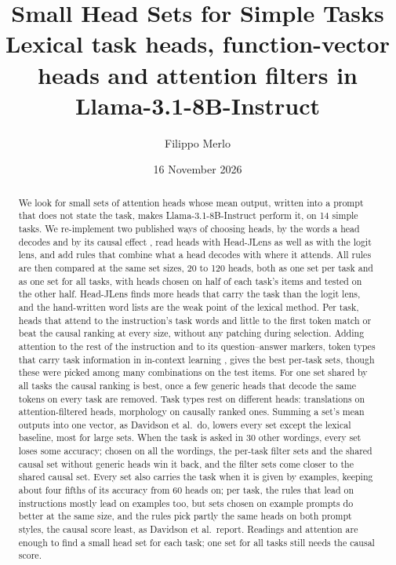 \documentclass[10pt,a4paper]{article}
\title{Small Head Sets for Simple Tasks\\[2pt]
\large Lexical task heads, function-vector heads and attention filters in Llama-3.1-8B-Instruct}
\author{Filippo Merlo}
\date{16 November 2026}
\begin{document}
\maketitle

\begin{abstract}
We look for small sets of attention heads whose mean output, written into a prompt that does not state the task, makes Llama-3.1-8B-Instruct perform it, on 14 simple tasks. We re-implement two published ways of choosing heads, by the words a head decodes \citep{yang2026shared} and by its causal effect \citep{davidson2025different}, read heads with Head-JLens as well as with the logit lens, and add rules that combine what a head decodes with where it attends. All rules are then compared at the same set sizes, 20 to 120 heads, both as one set per task and as one set for all tasks, with heads chosen on half of each task's items and tested on the other half. Head-JLens finds more heads that carry the task than the logit lens, and the hand-written word lists are the weak point of the lexical method. Per task, heads that attend to the instruction's task words and little to the first token match or beat the causal ranking at every size, without any patching during selection. Adding attention to the rest of the instruction and to its question--answer markers, token types that carry task information in in-context learning \citep{bai2026performance}, gives the best per-task sets, though these were picked among many combinations on the test items. For one set shared by all tasks the causal ranking is best, once a few generic heads that decode the same tokens on every task are removed. Task types rest on different heads: translations on attention-filtered heads, morphology on causally ranked ones. Summing a set's mean outputs into one vector, as Davidson et al.\ do, lowers every set except the lexical baseline, most for large sets. When the task is asked in 30 other wordings, every set loses some accuracy; chosen on all the wordings, the per-task filter sets and the shared causal set without generic heads win it back, and the filter sets come closer to the shared causal set. Every set also carries the task when it is given by examples, keeping about four fifths of its accuracy from 60 heads on; per task, the rules that lead on instructions mostly lead on examples too, but sets chosen on example prompts do better at the same size, and the rules pick partly the same heads on both prompt styles, the causal score least, as Davidson et al.\ report. Readings and attention are enough to find a small head set for each task; one set for all tasks still needs the causal score.
\end{abstract}
\end{document}
